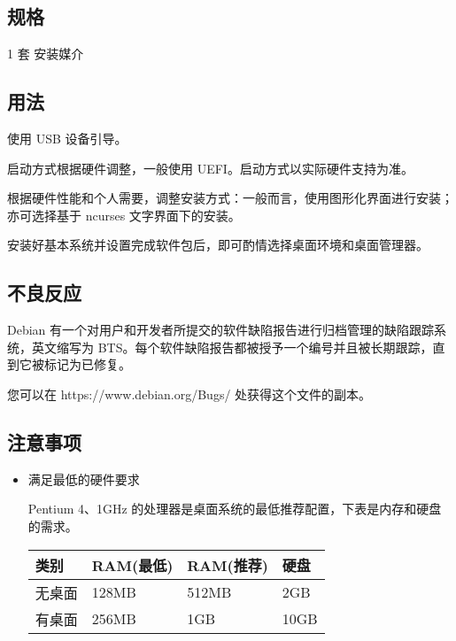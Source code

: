 \documentclass{article}
\begin{document}
\begin{multicols*}{3}
	\begin{tcolorbox}
	\section*{规格}
	\end{tcolorbox}

	1 套 安装媒介

	\medskip

	\begin{tcolorbox}
	\section*{用法}
	\end{tcolorbox}

	使用 USB 设备引导。

	启动方式根据硬件调整，一般使用 UEFI。启动方式以实际硬件支持为准。

	根据硬件性能和个人需要，调整安装方式：一般而言，使用图形化界面进行安装；亦可选择基于 ncurses 文字界面下的安装。

	安装好基本系统并设置完成软件包后，即可酌情选择桌面环境和桌面管理器。

	\medskip

	\begin{tcolorbox}
	\section*{不良反应}
	\end{tcolorbox}

	Debian 有一个对用户和开发者所提交的软件缺陷报告进行归档管理的缺陷跟踪系统，英文缩写为 BTS。每个软件缺陷报告都被授予一个编号并且被长期跟踪，直到它被标记为已修复。

	您可以在 https://www.debian.org/Bugs/ 处获得这个文件的副本。

	\medskip


	\begin{tcolorbox}
	\section*{注意事项}
	\end{tcolorbox}
	\begin{itemize}[leftmargin=*]

		\item 满足最低的硬件要求

		Pentium 4、1GHz 的处理器是桌面系统的最低推荐配置，下表是内存和硬盘的需求。

		{\small\begin{tabularx}{\linewidth}{|X|X|X|X|}
			\hline
			类别 & RAM\newline (最低) & RAM\newline (推荐) & 硬盘 \\
			\hline
			无桌面 & 128MB & 512MB & 2GB \\
			\hline
			有桌面 & 256MB & 1GB & 10GB \\
			\hline
		\end{tabularx}}


\end{itemize}
\end{multicols*}
\end{document}
